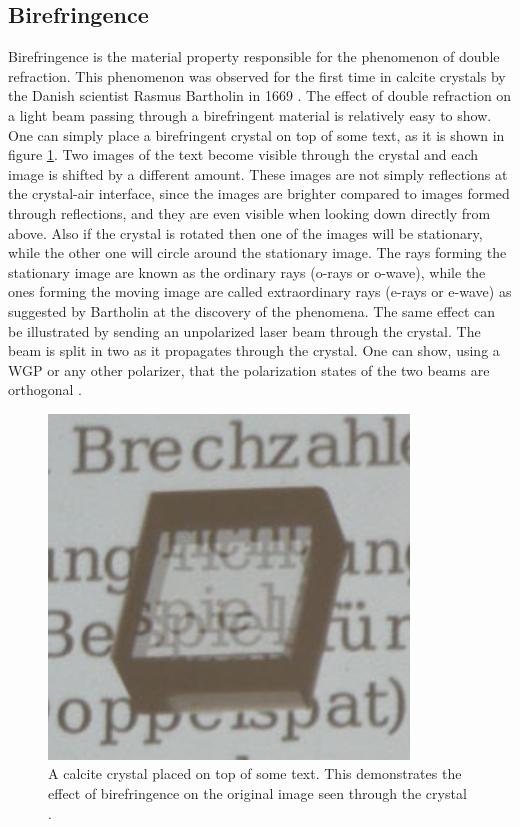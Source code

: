\subsection{Birefringence}
\label{sec:birefringence}
Birefringence is the material property responsible for the phenomenon of double refraction. This phenomenon was observed for the first time in calcite crystals by the Danish scientist Rasmus Bartholin in 1669 \cite{RasmusBartholin1669ExperimentaDetegitur, Restaino2015PolarizationDevices}. The effect of double refraction on a light beam passing through a birefringent material is relatively easy to show. One can simply place a birefringent crystal on top of some text, as it is shown in figure \ref{fig:3birefringence}. Two images of the text become visible through the crystal and each image is shifted by a different amount. These images are not simply reflections at the crystal-air interface, since the images are brighter compared to images formed through reflections, and they are even visible when looking down directly from above. Also if the crystal is rotated then one of the images will be stationary, while the other one will circle around the stationary image. The rays forming the stationary image are known as the ordinary rays (o-rays or o-wave), while the ones forming the moving image are called extraordinary rays (e-rays or e-wave) as suggested by Bartholin at the discovery of the phenomena. The same effect can be illustrated by sending an unpolarized laser beam through the crystal. The beam is split in two as it propagates through the crystal. One can show, using a WGP or any other polarizer, that the polarization states of the two beams are orthogonal \cite{Roth2019Optik}.

\begin{figure}[h]
    \centering
    \includegraphics[scale=0.3]{images/3_chapter03/birefringence.png}
    \caption{A calcite crystal placed on top of some text. This demonstrates the effect of birefringence on the original image seen through the crystal \cite{Roth2019Optik}.}
    \label{fig:3birefringence}
\end{figure}

